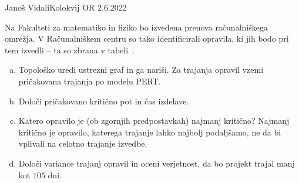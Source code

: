 \begin{naloga}{Janoš Vidali}{Kolokvij OR 2.6.2022}
\begin{vprasanje}
Na Fakulteti za matematiko in fiziko bo izvedena prenova računalniškega omrežja.
V Računalniškem centru so tako identificirali opravila,
ki jih bodo pri tem izvedli -- ta so zbrana v tabeli~\tab.

\begin{enumerate}[(a)]
\item Topološko uredi ustrezni graf in ga nariši.
Za trajanja opravil vzemi pričakovana trajanja po modelu PERT.

\item Določi pričakovano kritično pot in čas izdelave.

\item Katero opravilo je (ob zgornjih predpostavkah) najmanj kritično?
Najmanj kritično je opravilo, katerega trajanje lahko najbolj podaljšamo,
ne da bi vplivali na celotno trajanje izvedbe.

\item Določi variance trajanj opravil in oceni ve\-rjet\-nost,
da bo projekt trajal manj kot $105$ dni.
\end{enumerate}
%
\begin{tabela}
\end{tabela}
\end{vprasanje}


\end{naloga}
